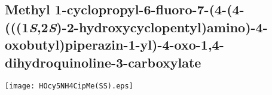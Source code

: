 \subsection{Methyl 1\hyp{}cyclopropyl\hyp{}6\hyp{}fluoro\hyp{}7\hyp{}(4\hyp{}(4\hyp{}(((1\textit{S},2\textit{S})\hyp{}2\hyp{}hydroxycyclopentyl)amin\allowbreak o)\hyp{}4\hyp{}oxobutyl)piperazin\hyp{}1\hyp{}yl)\hyp{}4\hyp{}oxo\hyp{}1,4\hyp{}dihydroquinoline\hyp{}3\hyp{}carboxylate }


\begin{scheme}[H]
	\begin{center}
		\texttt{[image: HOcy5NH4CipMe(SS).eps]}
	\end{center}
\end{scheme}

